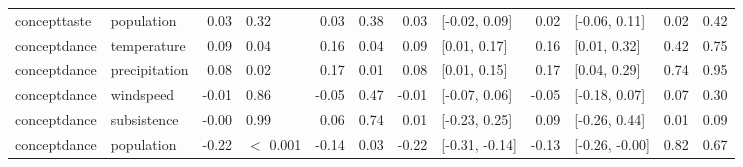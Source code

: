 \begin{table}[ht]
\begin{tabular}{llrlrlrlrlrr}
  concepttaste & population & 0.03 & 0.32 & 0.03 & 0.38 & 0.03 & [-0.02, 0.09] & 0.02 & [-0.06, 0.11] & 0.02 & 0.42 \\ 
  conceptdance & temperature & 0.09 & 0.04 & 0.16 & 0.04 & 0.09 & [0.01, 0.17] & 0.16 & [0.01, 0.32] & 0.42 & 0.75 \\ 
  conceptdance & precipitation & 0.08 & 0.02 & 0.17 & 0.01 & 0.08 & [0.01, 0.15] & 0.17 & [0.04, 0.29] & 0.74 & 0.95 \\ 
  conceptdance & windspeed & -0.01 & 0.86 & -0.05 & 0.47 & -0.01 & [-0.07, 0.06] & -0.05 & [-0.18, 0.07] & 0.07 & 0.30 \\ 
  conceptdance & subsistence & -0.00 & 0.99 & 0.06 & 0.74 & 0.01 & [-0.23, 0.25] & 0.09 & [-0.26, 0.44] & 0.01 & 0.09 \\ 
  conceptdance & population & -0.22 & $<$ 0.001 & -0.14 & 0.03 & -0.22 & [-0.31, -0.14] & -0.13 & [-0.26, -0.00] & 0.82 & 0.67 \\ 
   \hline
\end{tabular}
\end{table}
